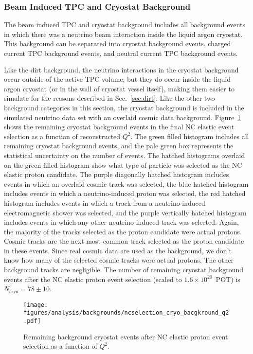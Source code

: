   \subsubsection{Beam Induced TPC and Cryostat Background}\label{sec:tpcbackgrounds}
    The beam induced TPC and cryostat background includes all background events
    in which there was a neutrino beam interaction inside the liquid argon
    cryostat. This background can be separated into cryostat background events,
    charged current TPC background events, and neutral current TPC background
    events.
    
    Like the dirt background, the neutrino interactions in the cryostat
    background occur outside of the active TPC volume, but they do occur inside
    the liquid argon cryostat (or in the wall of cryostat vessel itself),
    making them easier to simulate for the reasons described in
    Sec.~\ref{sec:dirt}. Like the other two background categories in this
    section, the cryostat background is included in the simulated neutrino data
    set with an overlaid cosmic data background.  Figure~\ref{fig:selectedcryo}
    shows the remaining cryostat background events in the final NC elastic
    event selection as a function of reconstructed $Q^2$. The green filled
    histogram includes all remaining cryostat background events, and the pale
    green box represents the statistical uncertainty on the number of events.
    The hatched histograms overlaid on the green filled histogram show what
    type of particle was selected as the NC elastic proton candidate. The
    purple diagonally hatched histogram includes events in which an overlaid
    cosmic track was selected, the blue hatched histogram includes events in
    which a neutrino-induced proton was selected, the red hatched histogram
    includes events in which a track from a neutrino-induced electromagnetic
    shower was selected, and the purple vertically hatched histogram includes
    events in which any other neutrino-induced track was selected. Again, the
    majority of the tracks selected as the proton candidate were actual
    protons. Cosmic tracks are the next most common track selected as the
    proton candidate in these events.  Since real cosmic data are used as the
    background, we don't know how many of the selected cosmic tracks were
    actual protons. The other background tracks are negligible. The number of
    remaining cryostat background events after the NC elastic proton event
    selection (scaled to $1.6\times 10^{20}$~POT) is $N_{\textrm{cryo}} = 78
    \pm 10$.
    \begin{figure}[ht]
      \centering
      \texttt{[image: figures/analysis/backgrounds/ncselection\_cryo\_bacgkround\_q2.pdf]}
      \caption{Remaining background cryostat events after NC elastic proton
      event selection as a function of $Q^2$.}
      \label{fig:selectedcryo}
    \end{figure}

